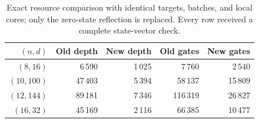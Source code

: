 \begin{table}[tb]
\centering\small
\caption{Exact resource comparison with identical targets, batches, and local cores; only the zero-state reflection is replaced. Every row received a complete state-vector check.}\label{tab:exactresources}
\begin{tabular}{@{}rrrrr@{}}
\toprule
$(n,d)$ & Old depth & New depth & Old gates & New gates\\
\midrule
$(8,16)$ & 6\,590 & 1\,025 & 7\,760 & 2\,540 \\
$(10,100)$ & 47\,403 & 5\,394 & 58\,137 & 15\,809 \\
$(12,144)$ & 89\,181 & 7\,346 & 116\,319 & 26\,827 \\
$(16,32)$ & 45\,169 & 2\,116 & 66\,385 & 10\,477 \\
\bottomrule
\end{tabular}
\end{table}
